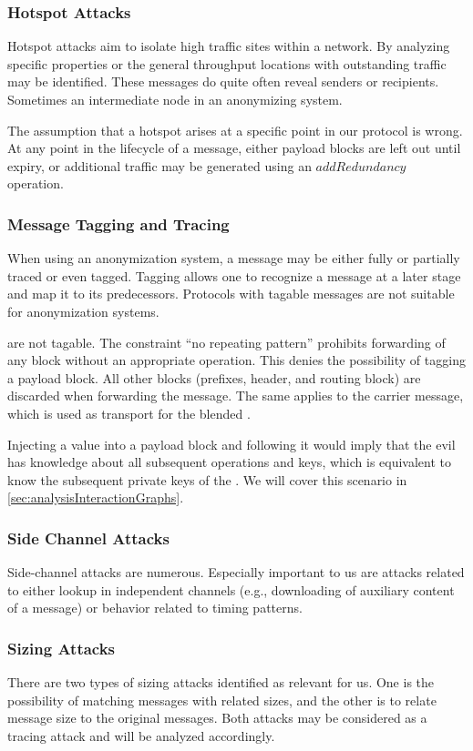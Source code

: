 \subsubsection{Hotspot Attacks}
Hotspot attacks aim to isolate high traffic sites within a network. By analyzing specific properties or the general throughput locations with outstanding traffic may be identified. These messages do quite often reveal senders or recipients. Sometimes an intermediate node in an anonymizing system. 

The assumption that a hotspot arises at a specific point in our protocol is wrong. At any point in the lifecycle of a message, either payload blocks are left out until expiry, or additional traffic may be generated using an $addRedundancy$ operation.

\subsubsection{Message Tagging and Tracing}
When using an anonymization system, a message may be either fully or partially traced or even tagged. Tagging allows one to recognize a message at a later stage and map it to its predecessors. Protocols with tagable messages are not suitable for anonymization systems.

\VortexMessages{} are not tagable. The constraint ``no repeating pattern'' prohibits forwarding of any block without an appropriate operation. This denies the possibility of tagging a payload block. All other blocks (prefixes, header, and routing block) are discarded when forwarding the message. The same applies to the carrier message, which is used as transport for the blended \VortexMessage.

Injecting a value into a payload block and following it would imply that the evil \VortexNode{} has knowledge about all subsequent operations and keys, which is equivalent to know the subsequent private keys of the \VortexNodes. We will cover this scenario in \cref{sec:analysisInteractionGraphs}.

\subsubsection{Side Channel Attacks}
Side-channel attacks are numerous. Especially important to us are attacks related to either lookup in independent channels (e.g., downloading of auxiliary content of a message) or behavior related to timing patterns.

\subsubsection{Sizing Attacks}
There are two types of sizing attacks identified as relevant for us. One is the possibility of matching messages with related sizes, and the other is to relate message size to the original messages. Both attacks may be considered as a tracing attack and will be analyzed accordingly. 

